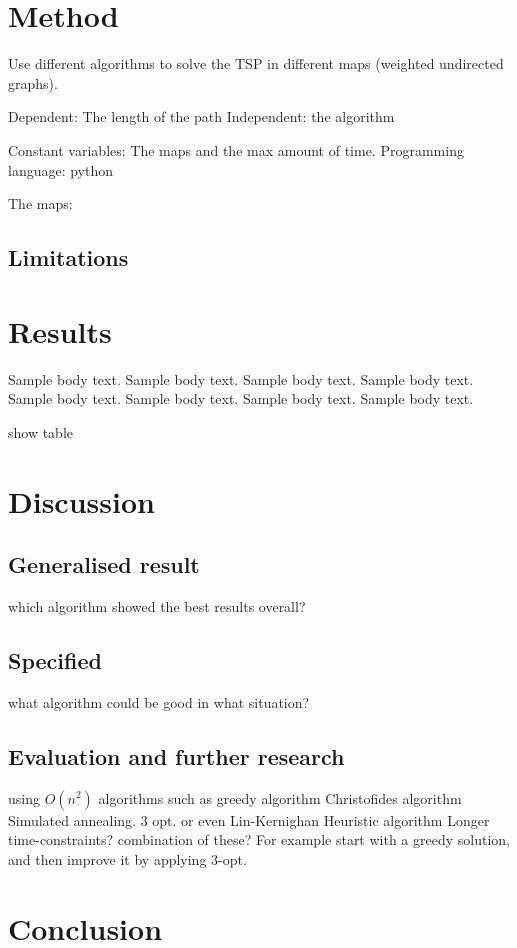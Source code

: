 \documentclass{article}
\begin{document}
\section{Method}\label{sec2}
Use different algorithms to solve the TSP in different maps (weighted undirected graphs).




Dependent: The length of the path
Independent: the algorithm


Constant variables: The maps and the max amount of time. Programming language: python

The maps: 

\subsection{Limitations}\label{subsec3}







\section{Results}\label{sec3}

Sample body text. Sample body text. Sample body text. Sample body text. Sample body text. Sample body text. Sample body text. Sample body text.

show table






\section{Discussion}\label{sec4}


\subsection{Generalised result}\label{subsec1}
which algorithm showed the best results overall?


\subsection{Specified }\label{subsec2}
what algorithm could be good in what situation?


\subsection{Evaluation and further research}\label{subsec3}
using $O(n^2)$ algorithms such as 
greedy algorithm
Christofides algorithm
Simulated annealing.
3 opt. or even Lin-Kernighan Heuristic algorithm
Longer time-constraints?
combination of these? For example start with a greedy solution, and then improve it by applying 3-opt.

\section{Conclusion}\label{sec5}






\newpage

 \label{sec6}
\end{document}
